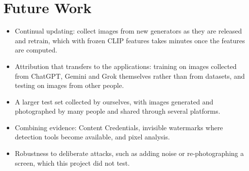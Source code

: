 \documentclass{mnnit}
\begin{document}
\section{Future Work}
\begin{itemize}
  \item Continual updating: collect images from new generators as they
        are released and retrain, which with frozen CLIP features takes
        minutes once the features are computed.
  \item Attribution that transfers to the applications: training on
        images collected from ChatGPT, Gemini and Grok themselves rather
        than from datasets, and testing on images from other people.
  \item A larger test set collected by ourselves, with images generated
        and photographed by many people and shared through several
        platforms.
  \item Combining evidence: Content Credentials, invisible watermarks
        where detection tools become available, and pixel analysis.
  \item Robustness to deliberate attacks, such as adding noise or
        re-photographing a screen, which this project did not test.
\end{itemize}


{\renewcommand{\baselinestretch}{1.15}\selectfont

\par}

\clearpage
{}
{}

\end{document}
